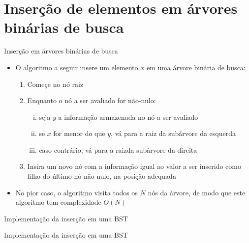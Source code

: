 \section{Inserção de elementos em árvores binárias de busca}

\begin{frame}[fragile]{Inserção em árvores binárias de busca}
    \begin{itemize}
	    \item O algoritmo a seguir insere um elemento $x$ em uma árvore binária de busca:

	\begin{enumerate}
		\item Começe no nó raiz

		\item Enquanto o nó a ser avaliado for não-nulo:

		\begin{enumerate}[i.]
            \item seja $y$ a informação armazenada no nó a ser avaliado

            \item se $x$ for menor do que $y$, vá para a raiz da subárvore da esquerda

            \item caso contrário, vá para a raizda subárvore da direita
		\end{enumerate}

		\item Insira um novo nó com a informação igual ao valor a ser inserido como { filho} do último nó não-nulo, na posição adequada
	\end{enumerate}

        \item No pior caso, o algoritmo visita todos os $N$ nós da árvore, de modo que este algoritmo tem complexidade $O(N)$
    \end{itemize}
\end{frame} 

\begin{frame}[fragile]{Implementação da inserção em uma BST}
\end{frame}

\begin{frame}[fragile]{Implementação da inserção em uma BST}
\end{frame}

